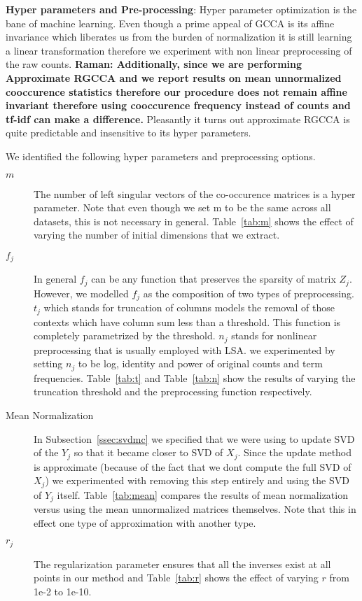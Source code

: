 \documentclass[11pt]{article}
\begin{document}
\textbf{Hyper parameters and Pre-processing}: Hyper parameter
optimization is the bane of machine learning. Even though a prime
appeal of GCCA is its affine invariance which liberates us from the 
burden of normalization it is still learning a linear transformation
therefore we experiment with non linear preprocessing of the raw
counts. \textbf{Raman: Additionally, since  we are performing Approximate RGCCA and
we report results on mean unnormalized cooccurence statistics
therefore our procedure does not remain affine invariant therefore
using cooccurence frequency instead of counts and tf-idf can make a difference.}
Pleasantly it turns out approximate RGCCA is quite predictable and
insensitive to its hyper parameters.

We identified the following hyper parameters and preprocessing
options. 
\begin{description}
\item[$m$] The number of left singular vectors of the co-occurence
  matrices is a hyper parameter. Note that even though we set m to be
  the same across all datasets, this is not necessary in
  general. Table~\ref{tab:m} shows the effect of varying the number of
  initial dimensions that we extract.
\item [$f_j$] In general $f_j$ can be any function that preserves the sparsity
  of matrix $Z_j$. However, we modelled $f_j$ as the composition of two types of
  preprocessing. $t_j$ which stands for truncation of columns models
  the removal of those contexts which have column sum less than a
  threshold. This function is completely parametrized by the
  threshold. $n_j$ stands for nonlinear preprocessing that is usually
  employed with LSA. we experimented by setting $n_j$ to be log, identity and
  power of original counts and term frequencies. Table~\ref{tab:t} and
  Table~\ref{tab:n} show the results of varying the truncation
  threshold and the preprocessing function respectively.
\item [Mean Normalization] In Subsection~\ref{ssec:svdmc} we
  specified that we were using \cite{brand2006fast} to update SVD of
  the $Y_j$ so that it became closer to SVD of $X_j$. Since the update
  method is approximate (because of the fact that we dont compute the
  full SVD of $X_j$) we experimented with removing this step entirely
  and using the SVD of $Y_j$ itself. Table~\ref{tab:mean} compares the
  results of mean normalization versus using the mean unnormalized
  matrices themselves. Note that this in effect one type of
  approximation with another type.
\item [$r_j$] The regularization parameter ensures that all the
  inverses exist at all points in our method and Table~\ref{tab:r} shows the
  effect of varying $r$ from 1e-2 to 1e-10.
\end{description}
\end{document}

